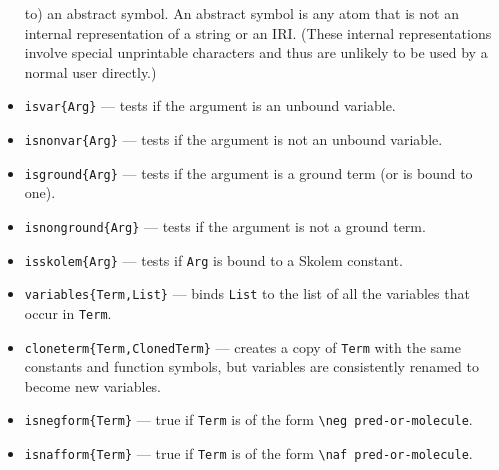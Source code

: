 \documentclass[11pt]{article}
\newcommand{\bs}{\textbackslash}
\begin{document}
\begin{itemize}
  to) an abstract symbol. An abstract symbol is any atom that is not an
  internal representation of a string or an IRI. (These internal
  representations involve special unprintable characters and thus are
  unlikely to be used by a normal user directly.)
\item \texttt{isvar\{Arg\}} --- tests if the argument is an unbound variable.
\item \texttt{isnonvar\{Arg\}} --- tests if the argument is not an unbound variable.
\item \texttt{isground\{Arg\}} --- tests if the argument is a ground term (or
  is bound to one).
\item \texttt{isnonground\{Arg\}} --- tests if the argument is not a ground term.
\item \texttt{isskolem\{Arg\}} --- tests if \texttt{Arg} is bound to a Skolem
  constant.  
\item \texttt{variables\{Term,List\}} --- binds \texttt{List} to the list
  of all the variables that occur in \texttt{Term}.   

\item \texttt{cloneterm\{Term,ClonedTerm\}} --- creates a copy of
  \texttt{Term} with the same constants and function symbols, but variables
  are consistently renamed to become new variables.
  
\item \texttt{isnegform\{Term\}} --- true if \texttt{Term} is of the form
  \texttt{\bs{}neg pred-or-molecule}.  

\item \texttt{isnafform\{Term\}} --- true if \texttt{Term} is of the form
  \texttt{\bs{}naf pred-or-molecule}.  

\end{itemize}
\end{document}
